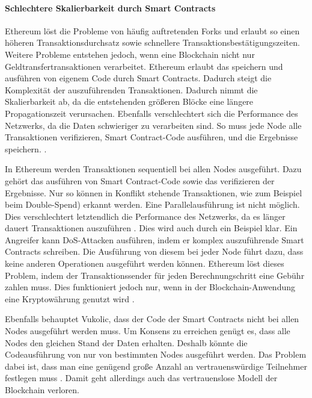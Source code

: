 \paragraph{Schlechtere Skalierbarkeit durch Smart Contracts}
Ethereum löst die Probleme von häufig auftretenden Forks und erlaubt so einen höheren Transaktionsdurchsatz sowie schnellere Transaktionsbestätigungszeiten. Weitere Probleme entstehen jedoch, wenn eine Blockchain nicht nur Geldtransfertransaktionen verarbeitet. Ethereum erlaubt das speichern und ausführen von eigenem Code durch Smart Contracts. Dadurch steigt die Komplexität der auszuführenden Transaktionen. Dadurch nimmt die Skalierbarkeit ab, da die entstehenden größeren Blöcke eine längere Propagationszeit verursachen. Ebenfalls verschlechtert sich die Performance des Netzwerks, da die Daten schwieriger zu verarbeiten sind. So muss jede Node alle Transaktionen verifizieren, Smart Contract-Code ausführen, und die Ergebnisse speichern. \cite{SchererPerformanceScalabilityBlockchain2017}. 

In Ethereum werden Transaktionen sequentiell bei allen Nodes ausgeführt. Dazu gehört das ausführen von Smart Contract-Code sowie das verifizieren der Ergebnisse. Nur so können in Konflikt stehende Transaktionen, wie zum Beispiel beim Double-Spend) erkannt werden. Eine Parallelausführung ist nicht möglich. Dies verschlechtert letztendlich die Performance des Netzwerks, da es länger dauert Transaktionen auszuführen \cite{SchererPerformanceScalabilityBlockchain2017}. Dies wird auch durch ein Beispiel klar. Ein Angreifer kann DoS-Attacken ausführen, indem er komplex auszuführende Smart Contracts schreiben. Die Ausführung von diesem bei jeder Node führt dazu, dass keine anderen Operationen ausgeführt werden können. Ethereum löst dieses Problem, indem der Transaktionssender für jeden Berechnungschritt eine Gebühr zahlen muss. Dies funktioniert jedoch nur, wenn in der Blockchain-Anwendung eine Kryptowährung genutzt wird \cite{VukolicRethinkingPermissionedBlockchains2017}. 

Ebenfalls behauptet Vukolic, dass der Code der Smart Contracts nicht bei allen Nodes ausgeführt werden muss. Um Konsens zu erreichen genügt es, dass alle Nodes den gleichen Stand der Daten erhalten. Deshalb könnte die Codeausführung von nur von bestimmten Nodes ausgeführt werden. Das Problem dabei ist, dass man eine genügend große Anzahl an vertrauenswürdige Teilnehmer festlegen muss \cite{VukolicRethinkingPermissionedBlockchains2017}. Damit geht allerdings auch das vertrauenslose Modell der Blockchain verloren.

